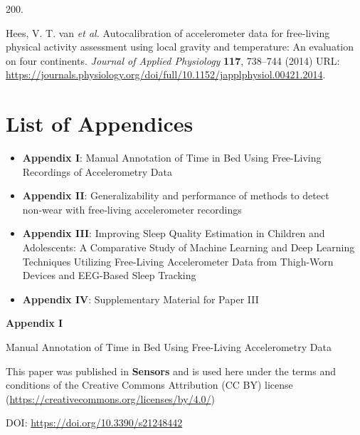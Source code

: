 \documentclass[
  10pt,
]{scrbook}
\newlength{\cslhangindent}
\newlength{\csllabelwidth}
\newlength{\cslentryspacingunit} %
\newenvironment{CSLReferences}[2] %
 {%
  \setlength{\parindent}{0pt}
  \ifodd #1
  \let\oldpar\par
  \def\par{\hangindent=\cslhangindent\oldpar}
  \fi
  \setlength{\parskip}{#2\cslentryspacingunit}
 }%
 {}
\newcommand{\CSLLeftMargin}[1]{\parbox[t]{\csllabelwidth}{#1}}
\newcommand{\CSLRightInline}[1]{\parbox[t]{\linewidth - \csllabelwidth}{#1}\break}
\let\originaltextbf\textbf
\renewcommand{\textbf}[1]{\textcolor{color1}{\textsf{\originaltextbf{#1}}}}
\begin{document}
\begin{CSLReferences}{0}{0}
\leavevmode{}%
\CSLLeftMargin{200. }%
\CSLRightInline{Hees, V. T. van \emph{et al.} Autocalibration of
accelerometer data for free-living physical activity assessment using
local gravity and temperature: An evaluation on four continents.
\emph{Journal of Applied Physiology} \textbf{117}, 738--744 (2014) URL:
\url{https://journals.physiology.org/doi/full/10.1152/japplphysiol.00421.2014}.}

\end{CSLReferences}

\hypertarget{list-of-appendices}{%
\chapter{List of Appendices}\label{list-of-appendices}}

\begin{itemize}
\item
  \textbf{Appendix I}: Manual Annotation of Time in Bed Using
  Free-Living Recordings of Accelerometry Data
\item
  \textbf{Appendix II}: Generalizability and performance of methods to
  detect non‑wear with free‑living accelerometer recordings
\item
  \textbf{Appendix III}: Improving Sleep Quality Estimation in Children
  and Adolescents: A Comparative Study of Machine Learning and Deep
  Learning Techniques Utilizing Free-Living Accelerometer Data from
  Thigh-Worn Devices and EEG-Based Sleep Tracking
\item
  \textbf{Appendix IV}: Supplementary Material for Paper III
\end{itemize}

\newpage

\begin{center}

\textbf{\textsf{\Huge Appendix I}}



\vspace{2cm}

\textsf{\Huge Manual Annotation of Time in Bed Using Free-Living Accelerometry Data}

\vspace{5cm}

This paper was published in \textbf{Sensors} and is used here under the terms and conditions of the Creative Commons Attribution (CC BY) license (\href{https://creativecommons.org/licenses/by/4.0/}{https://creativecommons.org/licenses/by/4.0/})

\vspace{1cm}

DOI: \href{https://doi.org/10.3390/s21248442}{https://doi.org/10.3390/s21248442}

\end{center}
\end{document}

